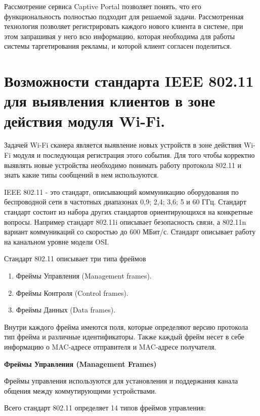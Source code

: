 Рассмотрение сервиса Captive Portal позволяет понять, что его функциональность полностью подходит для решаемой задачи. Рассмотренная технология позволяет регистрировать каждого нового клиента в системе, при этом запрашивая у него всю информацию, которая необходима для работы системы таргетирования рекламы, и которой клиент согласен поделиться.


\section{Возможности стандарта IEEE 802.11 для выявления клиентов в зоне действия модуля Wi-Fi.}

Задачей Wi-Fi сканера является выявление новых устройств в зоне действия Wi-Fi модуля и последующая регистрация этого события. Для того чтобы корректно выявлять новые устройства необходимо понимать работу протокола 802.11 и знать какие типы сообщений в нем используются.

IEEE 802.11 - это стандарт, описывающий коммуникацию оборудования по беспроводной сети в частотных диапазонах 0,9; 2,4; 3,6; 5 и 60 ГГц\cite{iee802_11}. Стандарт стандарт состоит из набора других стандартов ориентирующихся на конкретные вопросы. Например стандарт 802.11i описывает безопасность связи, а 802.11n вариант коммуникаций со скоростью до 600 МБит/с. Стандарт описывает работу на канальном уровне модели OSI.

Стандарт 802.11 описывает три типа фреймов

\begin{enumerate}
	\item Фреймы Управления (Management frames).
	\item Фреймы Контроля (Control frames).
	\item Фреймы Данных (Data frames).
\end{enumerate}

Внутри каждого фрейма имеются поля, которые определяют версию протокола тип фрейма и различные идентификаторы. Также каждый фрейм несет в себе информацию о MAC-адресе отправителя и MAC-адресе получателя.

\textbf{Фреймы Управления (Management Frames)}

Фреймы управления используются для установления и поддержания канала общения между коммутирующими устройствами.

Всего стандарт 802.11 определяет 14 типов фреймов управления:

